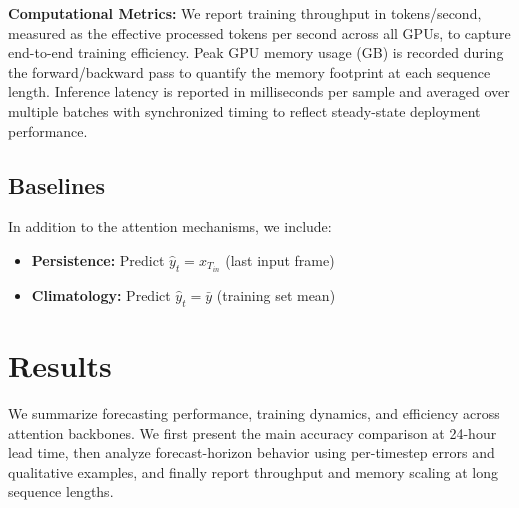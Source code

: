 \documentclass[runningheads]{llncs}
\begin{document}


\textbf{Computational Metrics:} We report training throughput in tokens/second, measured as the effective processed tokens per second across all GPUs, to capture end-to-end training efficiency. Peak GPU memory usage (GB) is recorded during the forward/backward pass to quantify the memory footprint at each sequence length. Inference latency is reported in milliseconds per sample and averaged over multiple batches with synchronized timing to reflect steady-state deployment performance.

\subsection{Baselines}

In addition to the attention mechanisms, we include:
\begin{itemize}
    \item \textbf{Persistence:} Predict $\hat{y}_t = x_{T_{in}}$ (last input frame)
    \item \textbf{Climatology:} Predict $\hat{y}_t = \bar{y}$ (training set mean)
\end{itemize}

\section{Results}
\label{sec:results}

We summarize forecasting performance, training dynamics, and efficiency across attention backbones. We first present the main accuracy comparison at 24-hour lead time, then analyze forecast-horizon behavior using per-timestep errors and qualitative examples, and finally report throughput and memory scaling at long sequence lengths.
\end{document}
